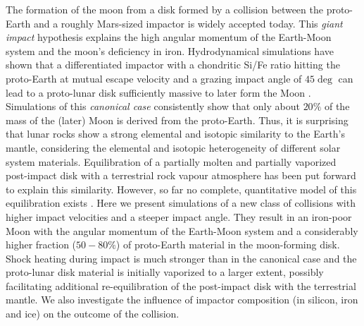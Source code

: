 The formation of the moon from a disk formed by a collision between the proto-Earth and a roughly Mars-sized impactor is widely accepted today. This \emph{giant impact} hypothesis \citep{1976LPI.....7..120C} explains the high angular momentum of the Earth-Moon system and the moon's deficiency in iron. Hydrodynamical simulations have shown that a differentiated impactor with a chondritic Si/Fe ratio hitting the proto-Earth at mutual escape velocity and a grazing impact angle of $45\deg$ can lead to a proto-lunar disk sufficiently massive to later form the Moon \citep{Canup:2001p1861}. Simulations of this \emph{canonical case} consistently show that only about $20\%$ of the mass of the (later) Moon is derived from the proto-Earth. Thus, it is surprising that lunar rocks show a strong elemental and isotopic similarity to the Earth's mantle, considering the elemental and isotopic heterogeneity of different solar system materials. Equilibration of a partially molten and partially vaporized post-impact disk with a terrestrial rock vapour atmosphere has been put forward \citep{Pahlevan:2007p2065} to explain this similarity. However, so far no complete, quantitative model of this equilibration exists \citep{2011E&PSL.301..433P}. Here we present simulations of a new class of collisions with higher impact velocities and a steeper impact angle. They result in an iron-poor Moon with the angular momentum of the Earth-Moon system and a considerably higher fraction ($50-80\%$) of proto-Earth material in the moon-forming disk. Shock heating during impact is much stronger than in the canonical case and the proto-lunar disk material is initially vaporized to a larger extent, possibly facilitating additional re-equilibration of the post-impact disk with the terrestrial mantle. We also investigate the influence of impactor composition (in silicon, iron and ice) on the outcome of the collision.

